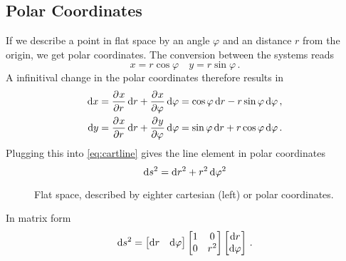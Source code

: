 \subsection*{Polar Coordinates}
If we describe a point in flat space by an angle $\varphi$ and an distance $r$
from the origin, we get polar coordinates. The conversion between the systems
reads
\begin{equation}
    x= r\cos\varphi\quad y= r\sin\varphi\,.
\end{equation}
A infinitival change in the polar coordinates therefore results in 
\begin{align}
    \dif x&= \dpd{x}{r}\dif r+\dpd{x}{\varphi}\dif \varphi = \cos\varphi\dif
    r-r\sin\varphi\dif \varphi\,,\\
    \dif y&= \dpd{x}{r}\dif r+\dpd{y}{\varphi}\dif \varphi = \sin\varphi\dif
    r+r\cos\varphi\dif \varphi\,.
\end{align}
Plugging this into \eqref{eq:cartline} gives the line element in polar coordinates
\begin{equation}
    \dif s^2=\dif r^2+r^2\dif \varphi^2
\end{equation}
\begin{figure}
    \centering
    \caption{Flat space, described by eighter cartesian (left) or polar
    coordinates.}
\end{figure}
In matrix form
\begin{equation}
    \dif s^2=
    \begin{bmatrix}
        \dif r& \dif \varphi
    \end{bmatrix}
    \begin{bmatrix}
        1& 0\\
        0& r^2\\
    \end{bmatrix}
    \begin{bmatrix}
        \dif r\\ \dif \varphi
    \end{bmatrix}\, .
\end{equation}
